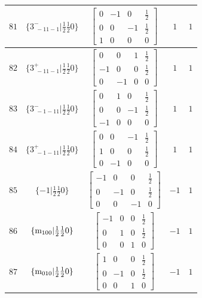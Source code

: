 \documentclass[fleqn,8pt]{jsarticle}
\begin{document}
\begin{longtable}{ccccc}
$ 81 $ & $ \{3^{-}_{\,\,-11-1}|\frac{1}{2} \frac{1}{2} 0\} $ & $ \begin{bmatrix} 0 & -1 & 0 & \frac{1}{2} \\ 0 & 0 & -1 & \frac{1}{2} \\ 1 & 0 & 0 & 0 \end{bmatrix} $ & $ 1 $ & $ 1 $ \\ \hline
$ 82 $ & $ \{3^{+}_{\,\,-11-1}|\frac{1}{2} \frac{1}{2} 0\} $ & $ \begin{bmatrix} 0 & 0 & 1 & \frac{1}{2} \\ -1 & 0 & 0 & \frac{1}{2} \\ 0 & -1 & 0 & 0 \end{bmatrix} $ & $ 1 $ & $ 1 $ \\ \hline
$ 83 $ & $ \{3^{-}_{\,\,-1-11}|\frac{1}{2} \frac{1}{2} 0\} $ & $ \begin{bmatrix} 0 & 1 & 0 & \frac{1}{2} \\ 0 & 0 & -1 & \frac{1}{2} \\ -1 & 0 & 0 & 0 \end{bmatrix} $ & $ 1 $ & $ 1 $ \\ \hline
$ 84 $ & $ \{3^{+}_{\,\,-1-11}|\frac{1}{2} \frac{1}{2} 0\} $ & $ \begin{bmatrix} 0 & 0 & -1 & \frac{1}{2} \\ 1 & 0 & 0 & \frac{1}{2} \\ 0 & -1 & 0 & 0 \end{bmatrix} $ & $ 1 $ & $ 1 $ \\ \hline
$ 85 $ & $ \{-1|\frac{1}{2} \frac{1}{2} 0\} $ & $ \begin{bmatrix} -1 & 0 & 0 & \frac{1}{2} \\ 0 & -1 & 0 & \frac{1}{2} \\ 0 & 0 & -1 & 0 \end{bmatrix} $ & $ -1 $ & $ 1 $ \\ \hline
$ 86 $ & $ \{{\rm m}_{100}|\frac{1}{2} \frac{1}{2} 0\} $ & $ \begin{bmatrix} -1 & 0 & 0 & \frac{1}{2} \\ 0 & 1 & 0 & \frac{1}{2} \\ 0 & 0 & 1 & 0 \end{bmatrix} $ & $ -1 $ & $ 1 $ \\ \hline
$ 87 $ & $ \{{\rm m}_{010}|\frac{1}{2} \frac{1}{2} 0\} $ & $ \begin{bmatrix} 1 & 0 & 0 & \frac{1}{2} \\ 0 & -1 & 0 & \frac{1}{2} \\ 0 & 0 & 1 & 0 \end{bmatrix} $ & $ -1 $ & $ 1 $ \\ \hline

\end{longtable}
\end{document}
